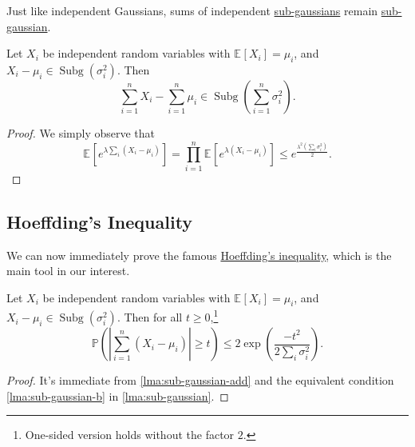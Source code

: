 Just like independent Gaussians, sums of independent \hyperref[def:sub-gaussian]{sub-gaussians} remain \hyperref[def:sub-gaussian]{sub-gaussian}.

\begin{lemma}\label{lma:sub-gaussian-add}
	Let \(X_i\) be independent random variables with \(\mathbb{E}_{}\left[X_i \right] = \mu _i\), and \(X_i - \mu _i \in \mathop{\mathrm{Subg}}\left( \sigma _i^2 \right)  \). Then
	\[
		\sum_{i=1}^n X_i - \sum_{i=1}^n \mu _i \in \mathop{\mathrm{Subg}}\left( \sum_{i=1}^n \sigma _i^2 \right) .
	\]
\end{lemma}
\begin{proof}
	We simply observe that
	\[
		\mathbb{E}_{}\left[e^{\lambda \sum_{i} (X_i - \mu _i)} \right]
		= \prod _{i=1}^n \mathbb{E}_{}\left[e^{\lambda (X_i - \mu _i)} \right]
		\leq e^{\frac{\lambda ^2 (\sum_{i} \sigma _i^2)}{2}}.
	\]
\end{proof}

\subsection{Hoeffding's Inequality}
We can now immediately prove the famous \hyperref[thm:Hoeffding-inequality]{Hoeffding's inequality}, which is the main tool in our interest.

\begin{theorem}\label{thm:Hoeffding-inequality}
	Let \(X_i\) be independent random variables with \(\mathbb{E}_{}\left[X_i \right] = \mu _i\), and \(X_i - \mu _i \in \mathop{\mathrm{Subg}}(\sigma _i^2) \). Then for all \(t \geq 0\),\footnote{One-sided version holds without the factor \(2\).}
	\[
		\mathbb{P} \left( \left\vert \sum_{i=1}^n (X_i - \mu _i) \right\vert \geq t \right) \leq 2 \exp (\frac{-t^2}{2 \sum_{i} \sigma _i^2}).
	\]
\end{theorem}
\begin{proof}
	It's immediate from \autoref{lma:sub-gaussian-add} and the equivalent condition \autoref{lma:sub-gaussian-b} in \autoref{lma:sub-gaussian}.
\end{proof}